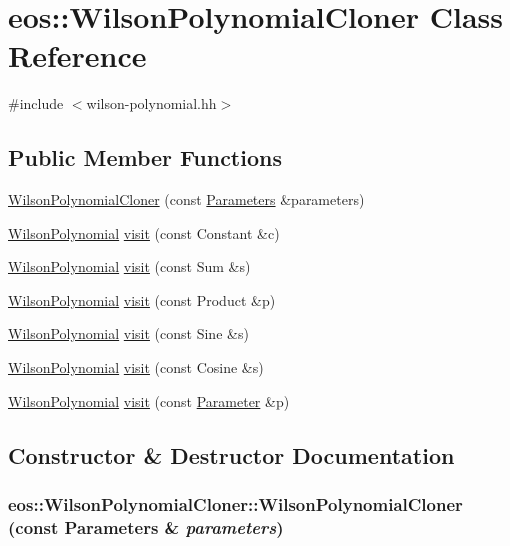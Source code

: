 \hypertarget{classeos_1_1WilsonPolynomialCloner}{
\section{eos::WilsonPolynomialCloner Class Reference}
\label{classeos_1_1WilsonPolynomialCloner}
}


{\ttfamily \#include $<$wilson-\/polynomial.hh$>$}\subsection*{Public Member Functions}
\begin{DoxyCompactItemize}
\item 
\hyperlink{classeos_1_1WilsonPolynomialCloner_a8e6b8a5026408945a15c9604d56fb19b}{WilsonPolynomialCloner} (const \hyperlink{classeos_1_1Parameters}{Parameters} \&parameters)
\item 
\hyperlink{classeos_1_1OneOf}{WilsonPolynomial} \hyperlink{classeos_1_1WilsonPolynomialCloner_a636e34f10bcf08e04d7e7afea3c0366c}{visit} (const Constant \&c)
\item 
\hyperlink{classeos_1_1OneOf}{WilsonPolynomial} \hyperlink{classeos_1_1WilsonPolynomialCloner_a17806441fa08134c7af096d4688499ab}{visit} (const Sum \&s)
\item 
\hyperlink{classeos_1_1OneOf}{WilsonPolynomial} \hyperlink{classeos_1_1WilsonPolynomialCloner_a8bc46349f3e4d3329ab1cec99c4772a6}{visit} (const Product \&p)
\item 
\hyperlink{classeos_1_1OneOf}{WilsonPolynomial} \hyperlink{classeos_1_1WilsonPolynomialCloner_a6ee57d202b84e984bc7cefcfe9934382}{visit} (const Sine \&s)
\item 
\hyperlink{classeos_1_1OneOf}{WilsonPolynomial} \hyperlink{classeos_1_1WilsonPolynomialCloner_aab4e3ed7514915cd2957dfe5b7b71cc1}{visit} (const Cosine \&s)
\item 
\hyperlink{classeos_1_1OneOf}{WilsonPolynomial} \hyperlink{classeos_1_1WilsonPolynomialCloner_adb3fc646a9af1e6ed77846378cce5843}{visit} (const \hyperlink{classeos_1_1Parameter}{Parameter} \&p)
\end{DoxyCompactItemize}


\subsection{Constructor \& Destructor Documentation}
\hypertarget{classeos_1_1WilsonPolynomialCloner_a8e6b8a5026408945a15c9604d56fb19b}{
\subsubsection[{WilsonPolynomialCloner}]{\setlength{\rightskip}{0pt plus 5cm}eos::WilsonPolynomialCloner::WilsonPolynomialCloner (const {\bf Parameters} \& {\em parameters})}}
\label{classeos_1_1WilsonPolynomialCloner_a8e6b8a5026408945a15c9604d56fb19b}


